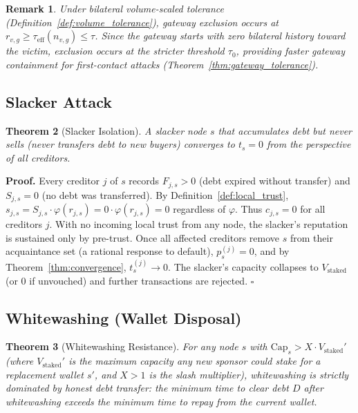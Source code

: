 \documentclass[11pt]{article}
\newtheorem{theorem}{Theorem}[section]
\newtheorem{remark}[theorem]{Remark}
\newcommand{\qed}{\hfill}
\newenvironment{proof}{\noindent\textbf{Proof.}}{\qed$\square$\par\medskip}
\begin{document}
\begin{remark}
Under bilateral volume-scaled tolerance (Definition~\ref{def:volume_tolerance}), gateway exclusion occurs at $r_{v,g} \geq \tau_{\text{eff}}(n_{v,g}) \leq \tau$. Since the gateway starts with zero bilateral history toward the victim, exclusion occurs at the stricter threshold $\tau_0$, providing \emph{faster} gateway containment for first-contact attacks (Theorem~\ref{thm:gateway_tolerance}).
\end{remark}

\subsection{Slacker Attack}

\begin{theorem}[Slacker Isolation]\label{thm:slacker}
A slacker node $s$ that accumulates debt but never sells (never transfers debt to new buyers) converges to $t_s = 0$ from the perspective of all creditors.
\end{theorem}

\begin{proof}
Every creditor $j$ of $s$ records $F_{j,s} > 0$ (debt expired without transfer) and $S_{j,s} = 0$ (no debt was transferred). By Definition~\ref{def:local_trust}, $s_{j,s} = S_{j,s} \cdot \varphi(r_{j,s}) = 0 \cdot \varphi(r_{j,s}) = 0$ regardless of $\varphi$. Thus $c_{j,s} = 0$ for all creditors $j$. With no incoming local trust from any node, the slacker's reputation is sustained only by pre-trust. Once all affected creditors remove $s$ from their acquaintance set (a rational response to default), $p^{(j)}_s = 0$, and by Theorem~\ref{thm:convergence}, $t^{(j)}_s \to 0$. The slacker's capacity collapses to $V_{\text{staked}}$ (or $0$ if unvouched) and further transactions are rejected. \qed
\end{proof}

\subsection{Whitewashing (Wallet Disposal)}

\begin{theorem}[Whitewashing Resistance]\label{thm:whitewash}
For any node $s$ with $\mathrm{Cap}_s > X \cdot V_{\text{staked}}'$ (where $V_{\text{staked}}'$ is the maximum capacity any new sponsor could stake for a replacement wallet $s'$, and $X > 1$ is the slash multiplier), whitewashing is strictly dominated by honest debt transfer: the minimum time to clear debt $D$ after whitewashing exceeds the minimum time to repay from the current wallet.
\end{theorem}
\end{document}
